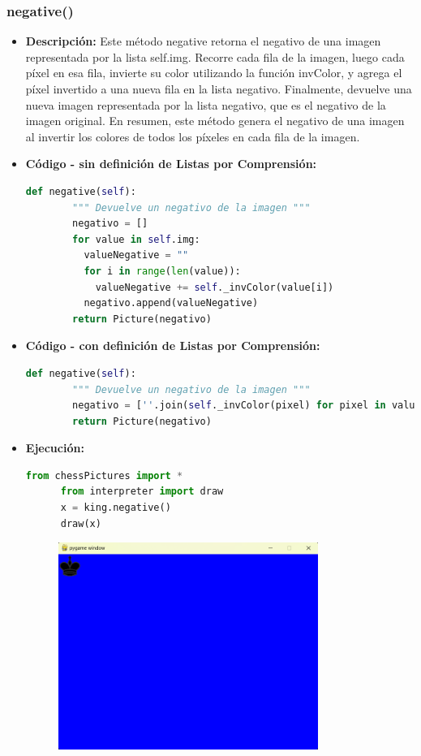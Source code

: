 \documentclass{article}
\begin{document}

  \subsubsection{negative()}
  \begin{itemize}
    \item \textbf{Descripción: }Este método negative retorna el negativo de una imagen representada 
      por la lista self.img. Recorre cada fila de la imagen, luego cada píxel en esa fila, invierte su color utilizando la 
      función invColor, y agrega el píxel invertido a una nueva fila en la lista negativo. 
      \newpage
      Finalmente, devuelve una nueva imagen representada por la lista negativo, que es el negativo de la imagen original. 
      En resumen, este método genera el negativo de una imagen al invertir los colores de todos los píxeles en cada fila de la imagen.
    \item \textbf{Código - sin definición de Listas por Comprensión:}
    \begin{lstlisting}[language=Python, caption=Método negative()]
      def negative(self):
        """ Devuelve un negativo de la imagen """
        negativo = []
        for value in self.img:
          valueNegative = ""
          for i in range(len(value)):
            valueNegative += self._invColor(value[i])
          negativo.append(valueNegative)
        return Picture(negativo)
    \end{lstlisting}
    \item \textbf{Código - con definición de Listas por Comprensión:}
    \begin{lstlisting}[language=Python, caption=Método negative()]
      def negative(self):
        """ Devuelve un negativo de la imagen """
        negativo = [''.join(self._invColor(pixel) for pixel in value) for value in self.img]
        return Picture(negativo)
    \end{lstlisting}
    \item \textbf{Ejecución:}
    \begin{lstlisting}[language=Python, caption=Prueba de negative()]
      from chessPictures import *
      from interpreter import draw
      x = king.negative()
      draw(x)
    \end{lstlisting}
    \begin{figure}[H]
      \centering
      \includegraphics[width=0.8\textwidth, keepaspectratio]{img/negative.png}

\end{figure}
\end{itemize}
\end{document}
